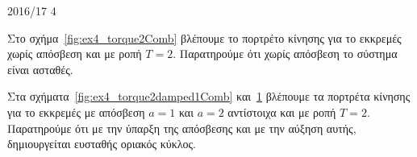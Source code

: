 \begin{solution}{2016/17 4}
\begin{figure}[h!]
        \caption{}
        \label{fig:ex4_torque2damped2Comb}
    \end{figure}

    Στο σχήμα~\ref{fig:ex4_torque2Comb} βλέπουμε το πορτρέτο κίνησης για το
    εκκρεμές χωρίς απόσβεση και με ροπή \( T = 2 \). Παρατηρούμε ότι χωρίς
    απόσβεση το σύστημα είναι ασταθές.

    Στα σχήματα~\ref{fig:ex4_torque2damped1Comb}
    και~\ref{fig:ex4_torque2damped2Comb} βλέπουμε τα πορτρέτα κίνησης για το
    εκκρεμές με απόσβεση \( a = 1 \) και \( a = 2 \) αντίστοιχα και με ροπή
    \( T = 2 \). Παρατηρούμε ότι με την ύπαρξη της απόσβεσης και με την αύξηση
    αυτής, δημιουργείται ευσταθής οριακός κύκλος.
\end{solution}
